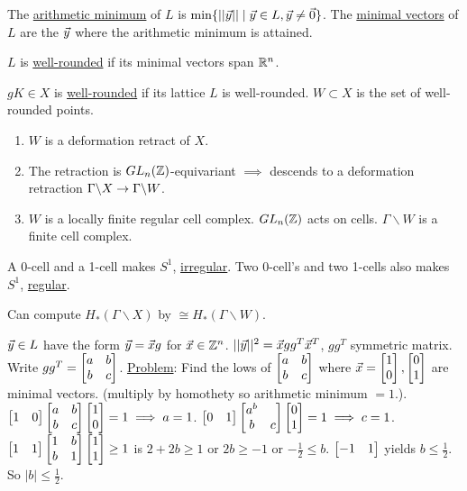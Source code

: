 \documentclass[]{article}
\begin{document}
\begin{definition}
	The \ul{arithmetic minimum} of $L$ is $\min\{||\vec{y}||\mid \vec{y}\in L, \vec{y}\neq \vec{0} \}$. The \ul{minimal vectors} of $L$ are the $\vec{y}$ where the arithmetic minimum is attained.
\end{definition}
\begin{definition}
	$L$ is \ul{well-rounded} if its minimal vectors span $\mathbb{R}^n$.
\end{definition}
\begin{definition}
	$gK\in X$ is \ul{well-rounded} if its lattice $L$ is well-rounded. $W\subset X$ is the set of well-rounded points.
\end{definition}
\begin{theorem}
	[Ash 1984] \begin{enumerate}
		\item $W$ is a deformation retract of $X$.
		\item The retraction is $GL_n(\mathbb{Z})$-equivariant $\implies$ descends to a deformation retraction $\Gamma\backslash X \rightarrow \Gamma\backslash W$.
		\item $W$ is a locally finite regular cell complex. $GL_n(\mathbb{Z})$ acts on cells. $\Gamma \backslash W$ is a finite cell complex.
	\end{enumerate}
\end{theorem}
A 0-cell and a 1-cell makes $S^1$, \ul{irregular}. Two 0-cell's and two 1-cells also makes $S^1$, \ul{regular}.
\begin{corollary}
	Can compute $H_*(\Gamma\backslash X)$ by $ \cong H_*(\Gamma\backslash W)$.
\end{corollary}
\begin{example}
	[$n=2$] $\vec{y}\in L$ have the form $\vec{y} = \vec{x} g$ for $\vec{x}\in \mathbb{Z}^n$. $||\vec{y}||^2 = \vec{x} g g^T \vec{x}^T$, $gg^T$ symmetric matrix. Write $gg^T = \begin{bmatrix}a&b\\b&c\end{bmatrix}$. \ul{Problem}: Find the lows of $\begin{bmatrix}a&b\\b&c\end{bmatrix}$ where $\vec{x} = \begin{bmatrix}1\\0\end{bmatrix},\begin{bmatrix}0\\1\end{bmatrix}$ are minimal vectors. (multiply by homothety so arithmetic minimum $ = 1$.). $\begin{bmatrix}1&0\end{bmatrix}\begin{bmatrix}a&b\\b&c\end{bmatrix}\begin{bmatrix}1\\0\end{bmatrix} = 1 \implies a = 1$. $\begin{bmatrix}0&1\end{bmatrix} \begin{bmatrix}a^b\\b&c\end{bmatrix} \begin{bmatrix}0\\1\end{bmatrix} = 1 \implies c = 1$. $\begin{bmatrix}1&1\end{bmatrix}\begin{bmatrix}1&b\\b&1\end{bmatrix}\begin{bmatrix}1\\1\end{bmatrix} \geq 1$ is $2+2b \geq 1$ or $2b\geq -1$ or $-\frac{1}{2} \leq b$. $\begin{bmatrix}-1&1\end{bmatrix}$ yields $b\leq \frac{1}{2}$. So $|b|\leq \frac{1}{2}$.
\end{example}
\end{document}
